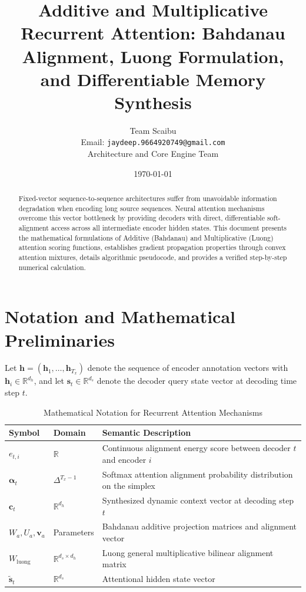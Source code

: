 \documentclass[11pt,a4paper]{article}
\title{Additive and Multiplicative Recurrent Attention: Bahdanau Alignment, Luong Formulation, and Differentiable Memory Synthesis}
\author{Team Scaibu \\ \small Email: \texttt{jaydeep.9664920749@gmail.com} \\ \small Architecture and Core Engine Team}
\date{\today}
\theoremstyle{definition}
\begin{document}
\maketitle

\begin{abstract}
Fixed-vector sequence-to-sequence architectures suffer from unavoidable information degradation when encoding long source sequences. Neural attention mechanisms overcome this vector bottleneck by providing decoders with direct, differentiable soft-alignment access across all intermediate encoder hidden states. This document presents the mathematical formulations of Additive (Bahdanau) and Multiplicative (Luong) attention scoring functions, establishes gradient propagation properties through convex attention mixtures, details algorithmic pseudocode, and provides a verified step-by-step numerical calculation.
\end{abstract}

\section{Notation and Mathematical Preliminaries}

Let $\mathbf{h} = (\mathbf{h}_1, \dots, \mathbf{h}_{T_x})$ denote the sequence of encoder annotation vectors with $\mathbf{h}_i \in \mathbb{R}^{d_h}$, and let $\mathbf{s}_t \in \mathbb{R}^{d_s}$ denote the decoder query state vector at decoding time step $t$.

\begin{table}[h]
\centering
\caption{Mathematical Notation for Recurrent Attention Mechanisms}
\begin{tabular}{lll}
\toprule
\textbf{Symbol} & \textbf{Domain} & \textbf{Semantic Description} \\
\midrule
$e_{t, i}$ & $\mathbb{R}$ & Continuous alignment energy score between decoder $t$ and encoder $i$ \\
$\boldsymbol{\alpha}_t$ & $\Delta^{T_x - 1}$ & Softmax attention alignment probability distribution on the simplex \\
$\mathbf{c}_t$ & $\mathbb{R}^{d_h}$ & Synthesized dynamic context vector at decoding step $t$ \\
$W_a, U_a, \mathbf{v}_a$ & Parameters & Bahdanau additive projection matrices and alignment vector \\
$W_{\text{luong}}$ & $\mathbb{R}^{d_s \times d_h}$ & Luong general multiplicative bilinear alignment matrix \\
$\tilde{\mathbf{s}}_t$ & $\mathbb{R}^{d_s}$ & Attentional hidden state vector \\
\bottomrule
\end{tabular}
\end{table}
\end{document}
